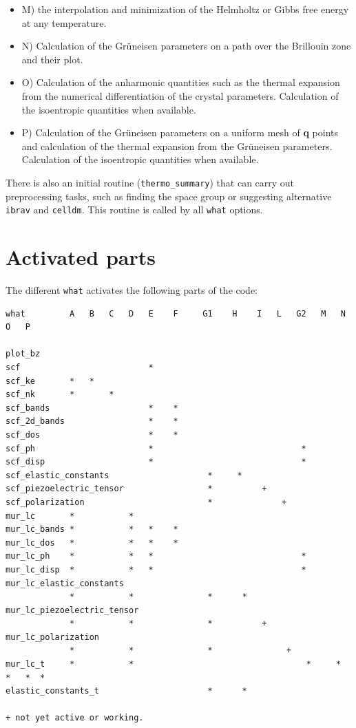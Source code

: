 \documentclass[12pt,a4paper]{article}
\begin{document}
\begin{itemize}

\item
M) the interpolation and minimization of the 
Helmholtz or Gibbs free energy at any temperature.

\item
N) Calculation of the Gr\"uneisen parameters on a path over the Brillouin
zone and their plot.

\item
O) Calculation of the anharmonic quantities such as the thermal expansion
from the numerical differentiation of the crystal parameters. Calculation
of the isoentropic quantities when available.

\item
P) Calculation of the Gr\"uneisen parameters on a uniform mesh of {\bf q} 
points and calculation of the thermal expansion from the Gr\"uneisen parameters.
Calculation of the isoentropic quantities when available.

\end{itemize}
There is also an initial routine (\texttt{thermo\_summary}) that can carry
out preprocessing tasks, such as finding the space group or suggesting
alternative \texttt{ibrav} and \texttt{celldm}. This routine is called by
all \texttt{what} options.

\newpage
\section{\color{coral}Activated parts}

The different \texttt{what} activates the following parts of the code:

\begin{verbatim}
what         A   B   C   D   E    F     G1    H    I   L   G2   M   N   O   P

plot_bz
scf                          *
scf_ke       *   *
scf_nk       *       *
scf_bands                    *    *
scf_2d_bands                 *    *
scf_dos                      *    *
scf_ph                       *                              *
scf_disp                     *                              *
scf_elastic_constants                    *     *
scf_piezoelectric_tensor                 *          +
scf_polarization                         *              +
mur_lc       *           *
mur_lc_bands *           *   *    *
mur_lc_dos   *           *   *    *
mur_lc_ph    *           *   *                              *
mur_lc_disp  *           *   *                              *
mur_lc_elastic_constants
             *           *               *      *
mur_lc_piezoelectric_tensor
             *           *               *          +
mur_lc_polarization
             *           *               *               +
mur_lc_t     *           *                                   *     *  *   *  *
elastic_constants_t                      *      *  

+ not yet active or working.
\end{verbatim}
\end{document}
